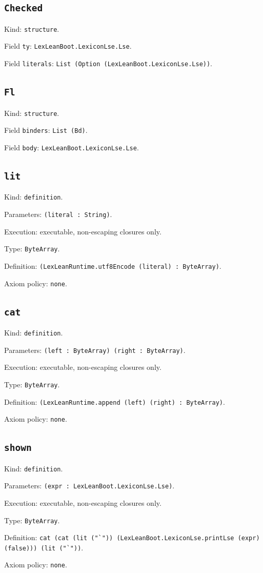 \documentclass[11pt]{article}
\begin{document}
\subsection*{\texttt{Checked}}
\noindent Kind: \texttt{structure}.\par
\noindent Field \texttt{ty}: \texttt{LexLeanBoot.LexiconLse.Lse}.\par
\noindent Field \texttt{literals}: \texttt{List (Option (LexLeanBoot.LexiconLse.Lse))}.\par
\subsection*{\texttt{Fl}}
\noindent Kind: \texttt{structure}.\par
\noindent Field \texttt{binders}: \texttt{List (Bd)}.\par
\noindent Field \texttt{body}: \texttt{LexLeanBoot.LexiconLse.Lse}.\par
\subsection*{\texttt{lit}}
\noindent Kind: \texttt{definition}.\par
\noindent Parameters: \texttt{(literal : String)}.\par
\noindent Execution: executable, non-escaping closures only.\par
\noindent Type: \texttt{ByteArray}.\par
\noindent Definition: \texttt{(LexLeanRuntime.utf8Encode (literal) : ByteArray)}.\par
\noindent Axiom policy: \texttt{none}.\par
\subsection*{\texttt{cat}}
\noindent Kind: \texttt{definition}.\par
\noindent Parameters: \texttt{(left : ByteArray) (right : ByteArray)}.\par
\noindent Execution: executable, non-escaping closures only.\par
\noindent Type: \texttt{ByteArray}.\par
\noindent Definition: \texttt{(LexLeanRuntime.append (left) (right) : ByteArray)}.\par
\noindent Axiom policy: \texttt{none}.\par
\subsection*{\texttt{shown}}
\noindent Kind: \texttt{definition}.\par
\noindent Parameters: \texttt{(expr : LexLeanBoot.LexiconLse.Lse)}.\par
\noindent Execution: executable, non-escaping closures only.\par
\noindent Type: \texttt{ByteArray}.\par
\noindent Definition: \texttt{cat (cat (lit ("`")) (LexLeanBoot.LexiconLse.printLse (expr) (false))) (lit ("`"))}.\par
\noindent Axiom policy: \texttt{none}.\par
\end{document}
